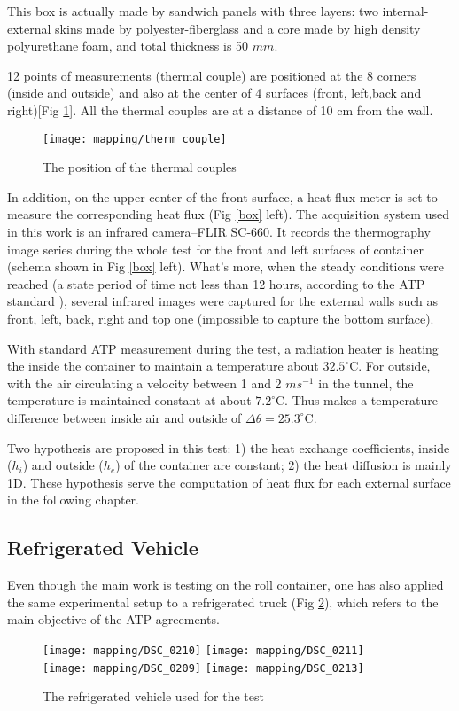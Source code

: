 This box is actually made by sandwich panels with three layers: two internal-external skins made by polyester-fiberglass and a core made by high density polyurethane foam, and total thickness is 50 $mm$. \label{box_detail}

12 points of measurements (thermal couple) are positioned at the 8 corners (inside and outside) and also at the center of 4 surfaces (front, left,back and right)[Fig \ref{therm_couple}]. All the thermal couples are at a distance of 10 cm from the wall.
\begin{figure}[!htbp]
	\centering
	\texttt{[image: mapping/therm\_couple]}
	\caption{The position of the thermal couples}
	\label{therm_couple}
\end{figure}
In addition, on the upper-center of the front surface, a heat flux meter is set to measure the corresponding heat flux (Fig \ref{box} left). The acquisition system used in this work is an infrared camera--FLIR SC-660. It records the thermography image series during the whole test for the front and left surfaces of container (schema shown in Fig \ref{box} left). What's more, when the steady conditions were reached (a state period of time not less than 12 hours, according to the ATP standard \citep{rossi2009k}), several infrared images were captured for the external walls such as front, left, back, right and top one (impossible to capture the bottom surface). 

With standard ATP measurement during the test, a radiation heater is heating the inside the container to maintain a temperature about $32.5^{\circ}$C. For outside, with the air circulating a velocity between 1 and 2 $m s^{-1}$ in the tunnel, the temperature is maintained constant at about $7.2^{\circ}$C. Thus makes a temperature difference between inside air and outside of $\Delta \theta = 25.3^{\circ}$C.

Two hypothesis are proposed in this test: 1) the  heat exchange coefficients, inside ($h_i$) and outside ($h_e$) of the container are constant;\label{hyp1} 2) the heat diffusion is mainly 1D. These hypothesis serve the computation of heat flux for each external surface in the following chapter.

\subsection{Refrigerated Vehicle}

Even though the main work is testing on the roll container, one has also applied the same experimental setup to a refrigerated truck (Fig \ref{truck}), which refers to the main objective of the ATP agreements.
\begin{figure}[!htbp]
	\hspace{-10mm}
	\texttt{[image: mapping/DSC\_0210]}
	\texttt{[image: mapping/DSC\_0211]}\\
	
	\texttt{[image: mapping/DSC\_0209]}
	\texttt{[image: mapping/DSC\_0213]}
	\caption{The refrigerated vehicle used for the test}
	\label{truck}
\end{figure}

